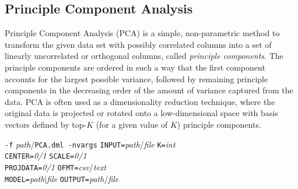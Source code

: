 \begin{comment}

 Licensed to the Apache Software Foundation (ASF) under one
 or more contributor license agreements.  See the NOTICE file
 distributed with this work for additional information
 regarding copyright ownership.  The ASF licenses this file
 to you under the Apache License, Version 2.0 (the
 "License"); you may not use this file except in compliance
 with the License.  You may obtain a copy of the License at

   http://www.apache.org/licenses/LICENSE-2.0

 Unless required by applicable law or agreed to in writing,
 software distributed under the License is distributed on an
 "AS IS" BASIS, WITHOUT WARRANTIES OR CONDITIONS OF ANY
 KIND, either express or implied.  See the License for the
 specific language governing permissions and limitations
 under the License.

\end{comment}

\subsection{Principle Component Analysis}
\label{pca}


Principle Component Analysis (PCA) is a simple, non-parametric method to transform the given data set with possibly correlated columns into a set of linearly uncorrelated or orthogonal columns, called {\em principle components}. The principle components are ordered in such a way that the first component accounts for the largest possible variance, followed by remaining principle components in the decreasing order of the amount of variance captured from the data. PCA is often used as a dimensionality reduction technique, where the original data is projected or rotated onto a low-dimensional space with basis vectors defined by top-$K$ (for a given value of $K$) principle components.
\\


\begin{tabbing}
\texttt{-f} \textit{path}/\texttt{PCA.dml -nvargs} 
\=\texttt{INPUT=}\textit{path}/\textit{file} 
  \texttt{K=}\textit{int} \\
\>\texttt{CENTER=}\textit{0/1}
  \texttt{SCALE=}\textit{0/1}\\
\>\texttt{PROJDATA=}\textit{0/1}
  \texttt{OFMT=}\textit{csv}/\textit{text}\\
\>\texttt{MODEL=}\textit{path}$\vert$\textit{file}
  \texttt{OUTPUT=}\textit{path}/\textit{file}
\end{tabbing}

